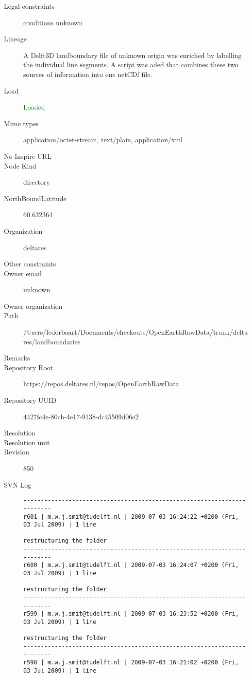 \documentclass[9]{report}
\begin{document}
\begin{description}
  \item[Legal constraints] conditions unknown
  \item[Lineage] A Delft3D landboundary file of unknown origin was enriched by labelling the individual line segments. A script was aded that combines these two sources of information into one netCDf file.
  \item[Load] \textcolor{green}{Loaded}
  \item[Mime types] application/octet-stream, text/plain, application/xml
  \item[No Inspire URL] 
  \item[Node Kind] directory
  \item[NorthBoundLatitude] 60.632364
  \item[Organization] deltares
  \item[Other constraints] 
  \item[Owner email] \href{mailto:unknown}{unknown}
  \item[Owner organization] 
  \item[Path] /Users/fedorbaart/Documents/checkouts/OpenEarthRawData/trunk/deltares/landboundaries
  \item[Remarks] 
  \item[Repository Root] \href{https://repos.deltares.nl/repos/OpenEarthRawData}{https://repos.deltares.nl/repos/OpenEarthRawData}
  \item[Repository UUID] 4427fc4e-80cb-4e17-9138-dc45509d06e2
  \item[Resolution] 
  \item[Resolution unit] 
  \item[Revision] 850
  \item[SVN Log] \begin{verbatim}
------------------------------------------------------------------------
r601 | m.w.j.smit@tudelft.nl | 2009-07-03 16:24:22 +0200 (Fri, 03 Jul 2009) | 1 line

restructuring the folder
------------------------------------------------------------------------
r600 | m.w.j.smit@tudelft.nl | 2009-07-03 16:24:07 +0200 (Fri, 03 Jul 2009) | 1 line

restructuring the folder
------------------------------------------------------------------------
r599 | m.w.j.smit@tudelft.nl | 2009-07-03 16:23:52 +0200 (Fri, 03 Jul 2009) | 1 line

restructuring the folder
------------------------------------------------------------------------
r598 | m.w.j.smit@tudelft.nl | 2009-07-03 16:21:02 +0200 (Fri, 03 Jul 2009) | 1 line


\end{verbatim}
\end{description}
\end{document}
